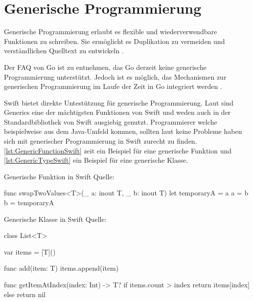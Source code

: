 \chapter{Generische Programmierung}
Generische Programmierung erlaubt es flexible und wiederverwendbare Funktionen zu schreiben. 
Sie ermöglicht es Duplikation zu vermeiden und verständlichen Quelltext zu entwickeln \cite[S.371]{Apple.2017}.


Der FAQ von Go ist zu entnehmen, das Go derzeit keine generische Programmierung unterstützt. 
Jedoch ist es möglich, das Mechanismen zur generischen Programmierung im Laufe der Zeit in Go integriert werden \cite{Golang.FAQ}.


Swift bietet direkte Untestützung für generische Programmierung.
Laut \cite[S.371]{Apple.2017} sind Generics eine der mächtigsten Funktionen von Swift und weden auch in der Standardbibliothek von Swift ausgiebig genutzt.
Programmierer welche beispielweise aus dem Java-Umfeld kommen, sollten laut \cite[S.206]{Hoffman.2017} keine Probleme haben sich mit generischer Programmierung in Swift zurecht zu finden.
\autoref{lst:GenericFunctionSwift} zeit ein Beispiel für eine generische Funktion und \autoref{lst:GenericTypeSwift} ein Beispiel für eine generische Klasse.

\begin{listing}
\caption{Generische Funktion in Swift Quelle: \cite[S.373]{Apple.2017}}
\label{lst:GenericFunctionSwift}
\begin{SwiftCode}
func swapTwoValues<T>(_ a: inout T, _ b: inout T) {
    let temporaryA = a
    a = b
    b = temporaryA
}
\end{SwiftCode}
\end{listing}

\begin{listing}
\caption{Generische Klasse in Swift Quelle: \cite[S.213]{Hoffman.2017}}
\label{lst:GenericTypeSwift}
\begin{SwiftCode}
class List<T> {
    var items = [T]()
    
    func add(item: T) {
        items.append(item)
    }
    
    func getItemAtIndex(index: Int) -> T? {
        if items.count > index {
            return items[index]
        } else {
            return nil
        }
    }
}
\end{SwiftCode}
\end{listing}
